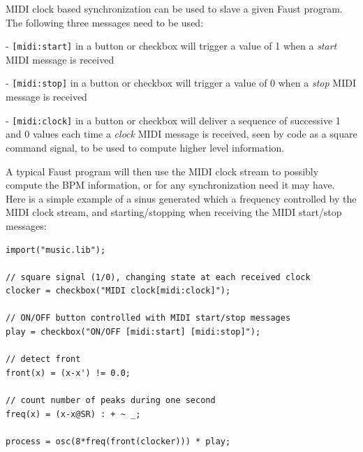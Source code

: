 MIDI clock based synchronization can be used to slave a given Faust program. The following three messages need to be used:

- \lstinline'[midi:start]' in a button or checkbox will trigger a value of 1 when a \emph{start} MIDI message is received

- \lstinline'[midi:stop]' in a button or checkbox will trigger a value of 0 when a \emph{stop} MIDI message is received

- \lstinline'[midi:clock]' in a button or checkbox will deliver a sequence of successive 1 and 0 values each time a  \emph{clock} MIDI message is received, seen by \faust code as a square command signal, to be used to compute higher level information.

A typical Faust program will then use the MIDI clock stream to possibly compute the BPM information, or for any synchronization need it may have.  Here is a simple example of a sinus generated which a frequency controlled by the MIDI clock stream, and starting/stopping when receiving the MIDI start/stop messages:

\begin{lstlisting}
import("music.lib");

// square signal (1/0), changing state at each received clock
clocker = checkbox("MIDI clock[midi:clock]");    

// ON/OFF button controlled with MIDI start/stop messages
play = checkbox("ON/OFF [midi:start] [midi:stop]");    

// detect front
front(x) = (x-x') != 0.0;      

// count number of peaks during one second
freq(x) = (x-x@SR) : + ~ _;   
   
process = osc(8*freq(front(clocker))) * play;
\end{lstlisting}




